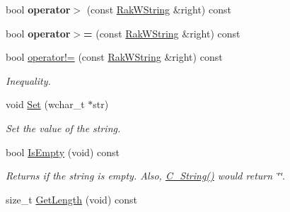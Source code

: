\begin{DoxyCompactItemize}
\item 
\hypertarget{class_rak_net_1_1_rak_w_string_af23a3894f5dfd14c8a9a6aee6c9f6ecf}{bool {\bfseries operator$>$} (const \hyperlink{class_rak_net_1_1_rak_w_string}{Rak\-W\-String} \&right) const }\label{class_rak_net_1_1_rak_w_string_af23a3894f5dfd14c8a9a6aee6c9f6ecf}

\item 
\hypertarget{class_rak_net_1_1_rak_w_string_a7955d311386eac9a844eb52f2ffdf328}{bool {\bfseries operator$>$=} (const \hyperlink{class_rak_net_1_1_rak_w_string}{Rak\-W\-String} \&right) const }\label{class_rak_net_1_1_rak_w_string_a7955d311386eac9a844eb52f2ffdf328}

\item 
\hypertarget{class_rak_net_1_1_rak_w_string_a2a8f4d283c66c5b50fc8ce47737f368d}{bool \hyperlink{class_rak_net_1_1_rak_w_string_a2a8f4d283c66c5b50fc8ce47737f368d}{operator!=} (const \hyperlink{class_rak_net_1_1_rak_w_string}{Rak\-W\-String} \&right) const }\label{class_rak_net_1_1_rak_w_string_a2a8f4d283c66c5b50fc8ce47737f368d}

\begin{DoxyCompactList}\small\item\em Inequality. \end{DoxyCompactList}\item 
\hypertarget{class_rak_net_1_1_rak_w_string_a1321881705cdcb8dc6db06bf5e505fbb}{void \hyperlink{class_rak_net_1_1_rak_w_string_a1321881705cdcb8dc6db06bf5e505fbb}{Set} (wchar\-\_\-t $\ast$str)}\label{class_rak_net_1_1_rak_w_string_a1321881705cdcb8dc6db06bf5e505fbb}

\begin{DoxyCompactList}\small\item\em Set the value of the string. \end{DoxyCompactList}\item 
\hypertarget{class_rak_net_1_1_rak_w_string_a5317f82a62d91baad42e4db54aba2709}{bool \hyperlink{class_rak_net_1_1_rak_w_string_a5317f82a62d91baad42e4db54aba2709}{Is\-Empty} (void) const }\label{class_rak_net_1_1_rak_w_string_a5317f82a62d91baad42e4db54aba2709}

\begin{DoxyCompactList}\small\item\em Returns if the string is empty. Also, \hyperlink{class_rak_net_1_1_rak_w_string_a47dcbc35b2623455845fdc3587661b21}{C\-\_\-\-String()} would return \char`\"{}\char`\"{}. \end{DoxyCompactList}\item 
\hypertarget{class_rak_net_1_1_rak_w_string_ac5a8d929e35a6bd586e31bf686eec2f7}{size\-\_\-t \hyperlink{class_rak_net_1_1_rak_w_string_ac5a8d929e35a6bd586e31bf686eec2f7}{Get\-Length} (void) const }\label{class_rak_net_1_1_rak_w_string_ac5a8d929e35a6bd586e31bf686eec2f7}


\end{DoxyCompactItemize}
